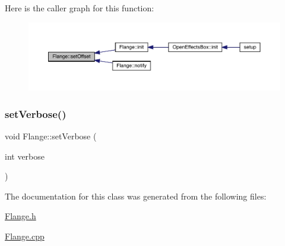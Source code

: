 Here is the caller graph for this function\+:\nopagebreak
\begin{figure}[H]
\begin{center}
\leavevmode
\includegraphics[width=350pt]{class_flange_a733bc8118f327fc4c31c896642ad49ad_icgraph}
\end{center}
\end{figure}
\mbox{\label{class_flange_ac44903a68dbb8a6de019b3f1e7205461}} 
\subsubsection{\texorpdfstring{set\+Verbose()}{setVerbose()}}
{\footnotesize\ttfamily void Flange\+::set\+Verbose (\begin{DoxyParamCaption}\item[{int}]{verbose }\end{DoxyParamCaption})}



The documentation for this class was generated from the following files\+:\begin{DoxyCompactItemize}
\item 
\mbox{\hyperlink{_flange_8h}{Flange.\+h}}\item 
\mbox{\hyperlink{_flange_8cpp}{Flange.\+cpp}}\end{DoxyCompactItemize}
